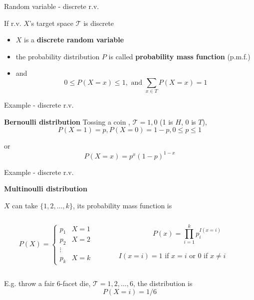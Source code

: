 \documentclass[ignorenonframetext,]{beamer}
\providecommand{\tightlist}{%
  \setlength{\itemsep}{0pt}\setlength{\parskip}{0pt}}
\begin{document}
\begin{frame}{Random variable - discrete r.v.}
\protect\hypertarget{random-variable---discrete-r.v.}{}

If r.v. \(X\)'s target space \(\mathcal{T}\) is discrete

\begin{itemize}
\tightlist
\item
  \(X\) is a \textbf{discrete random variable}
\item
  the probability distribution \(P\) is called \textbf{probability mass
  function} (p.m.f.)
\item
  and \[0\leq P(X=x) \leq 1, \text{ and } \sum_{x\in T} P(X=x) =1\]
\end{itemize}

\end{frame}

\begin{frame}{Example - discrete r.v.}
\protect\hypertarget{example---discrete-r.v.}{}

\textbf{Bernoulli distribution} Tossing a coin ,
\(\mathcal{T} = {1, 0}\) (1 is \(H\), 0 is \(T\)),
\[P(X=1) = p , P(X=0) = 1-p, 0\leq p\leq 1\]

or \[P(X=x) = p^{x}(1-p)^{1-x}\]

\end{frame}

\begin{frame}{Example - discrete r.v.}
\protect\hypertarget{example---discrete-r.v.-1}{}

\textbf{Multinoulli distribution}

\(X\) can take \(\{1, 2, \ldots,k\}\), its probability mass function is

\begin{columns}
\begin{column}{0.5\textwidth}
$$ P(X) =   \begin{cases} p_1 & X=1 \\
p_2 & X=2 \\
\vdots \\
p_k & X=k
\end{cases}$$

\end{column}
\begin{column}{0.5\textwidth}
$$P(x) = \prod_{i=1}^k p_i^{I(x=i)}$$

$I(x=i) = 1$ if $x=i$ or $0$ if $x\neq i$
\end{column}
\end{columns}

\bigskip

E.g. throw a fair 6-facet die, \(\mathcal{T} = {1, 2,\ldots, 6}\), the
distribution is \[P(X=i) = 1/6\]

\end{frame}
\end{document}
